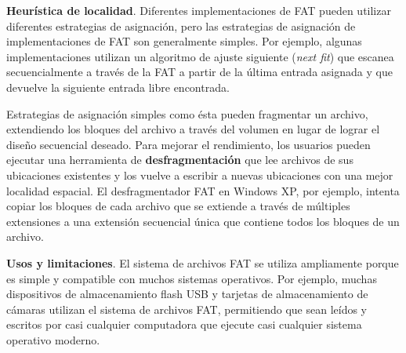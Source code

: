 \documentclass[10pt]{book}
\begin{document}
\textbf{Heurística de localidad}. Diferentes implementaciones de FAT pueden utilizar diferentes estrategias de asignación, pero las estrategias de asignación de implementaciones de FAT son generalmente simples. Por ejemplo, algunas implementaciones utilizan un algoritmo de ajuste siguiente (\textit{next fit}) que escanea secuencialmente a través de la FAT a partir de la última entrada asignada y que devuelve la siguiente entrada libre encontrada.

Estrategias de asignación simples como ésta pueden fragmentar un archivo, extendiendo los bloques del archivo a través del volumen en lugar de lograr el diseño secuencial deseado. Para mejorar el rendimiento, los usuarios pueden ejecutar una herramienta de \textbf{desfragmentación} que lee archivos de sus ubicaciones existentes y los vuelve a escribir a nuevas ubicaciones con una mejor localidad espacial. El desfragmentador FAT en Windows XP, por ejemplo, intenta copiar los bloques de cada archivo que se extiende a través de múltiples extensiones a una extensión secuencial única que contiene todos los bloques de un archivo.

\textbf{Usos y limitaciones}. El sistema de archivos FAT se utiliza ampliamente porque es simple y compatible con muchos sistemas operativos. Por ejemplo, muchas dispositivos de almacenamiento flash  USB y tarjetas de almacenamiento de cámaras utilizan el sistema de archivos FAT, permitiendo que sean leídos y escritos por casi cualquier computadora que ejecute casi cualquier sistema operativo moderno.
\end{document}
